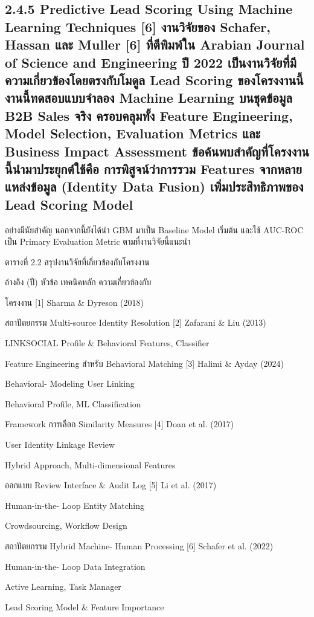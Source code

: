 \documentclass[12pt,a4paper]{report}
\begin{document}
\subsection*{2.4.5 Predictive Lead Scoring Using Machine Learning Techniques [6] งานวิจัยของ Schafer, Hassan และ Muller [6] ที่ตีพิมพ์ใน Arabian Journal of Science and Engineering ปี 2022 เป็นงานวิจัยที่มีความเกี่ยวข้องโดยตรงกับโมดูล Lead Scoring ของโครงงานนี้ งานนี้ทดสอบแบบจำลอง Machine Learning บนชุดข้อมูล B2B Sales จริง ครอบคลุมทั้ง Feature Engineering, Model Selection, Evaluation Metrics และ Business Impact Assessment ข้อค้นพบสำคัญที่โครงงานนี้นำมาประยุกต์ใช้คือ การพิสูจน์ว่าการรวม Features จากหลายแหล่งข้อมูล (Identity Data Fusion) เพิ่มประสิทธิภาพของ Lead Scoring Model}
\clearpage
อย่างมีนัยสำคัญ นอกจากนี้ยังได้นำ GBM มาเป็น Baseline Model เริ่มต้น และใช้ AUC-ROC เป็น Primary Evaluation Metric ตามที่งานวิจัยนี้แนะนำ\par
\begin{center}\small ตารางที่ 2.2 สรุปงานวิจัยที่เกี่ยวข้องกับโครงงาน\end{center}
อ้างอิง (ปี) หัวข้อ เทคนิคหลัก ความเกี่ยวข้องกับ\par
โครงงาน [1] Sharma \& Dyreson (2018)\par
สถาปัตยกรรม Multi-source Identity Resolution [2] Zafarani \& Liu (2013)\par
LINKSOCIAL Profile \& Behavioral Features, Classifier\par
Feature Engineering สำหรับ Behavioral Matching [3] Halimi \& Ayday (2024)\par
Behavioral- Modeling User Linking\par
Behavioral Profile, ML Classification\par
Framework การเลือก Similarity Measures [4] Doan et al. (2017)\par
User Identity Linkage Review\par
Hybrid Approach, Multi-dimensional Features\par
ออกแบบ Review Interface \& Audit Log [5] Li et al. (2017)\par
Human-in-the- Loop Entity Matching\par
Crowdsourcing, Workflow Design\par
สถาปัตยกรรม Hybrid Machine- Human Processing [6] Schafer et al. (2022)\par
Human-in-the- Loop Data Integration\par
Active Learning, Task Manager\par
Lead Scoring Model \& Feature Importance\par
\end{document}

